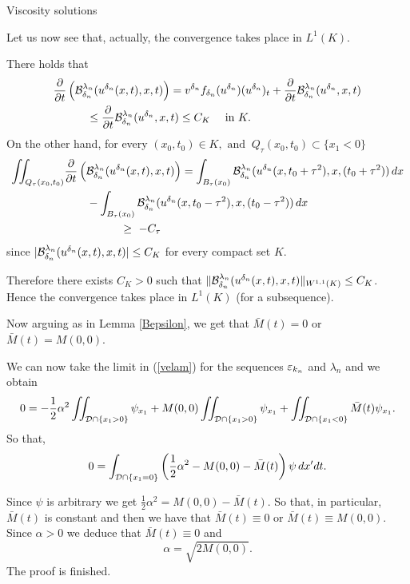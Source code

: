 \begin{section}{Viscosity solutions}
\begin{pf}
Let us now see that, actually,  the convergence takes place in $L^1(K)$.

There holds that 
\begin{align*}
&\frac{\partial}{\partial t}\left({\cal B}^{\lambda_n}_{\delta_n}
(u^{\delta_n}(x,t), x, t)\right) = 
v^{\delta_n}f_{\delta_n}(u^{\delta_n})(u^{\delta_n})_t + 
\frac{\partial}{\partial t}{\cal B}^{\lambda_n}_{\delta_n}
(u^{\delta_n},x, t)\\
&\qquad\quad\le \frac{\partial}{\partial t}{\cal B}^{\lambda_n}_{\delta_n}
(u^{\delta_n}, x, t)
\le C_K\quad\mbox{ in } K.
\end{align*}
On the other hand, for every $(x_0,t_0)\in K,\mbox{ and }\ Q_\tau(x_0,t_0)\subset\{x_1<0\}$
\begin{align*}
\iint_{Q_\tau(x_0,t_0)}&\frac{\partial}{\partial t}\left(
{\cal B}^{\lambda_n}_{\delta_n}(u^{\delta_n}(x,t), x, t)\right) =
\int_{B_\tau(x_0)}{\cal B}^{\lambda_n}_{\delta_n}
(u^{\delta_n}(x,t_0+\tau^2), x,(t_0+\tau^2))\, dx\\
& \qquad- \int_{B_\tau(x_0)}{\cal B}^{\lambda_n}_{\delta_n}
(u^{\delta_n}(x,t_0-\tau^2),x, (t_0-\tau^2))\, dx\\
&\quad\qquad\qquad \ge\ -C_\tau
\end{align*}
since $|{\cal B}^{\lambda_n}_{\delta_n}(u^{\delta_n}(x,t), x, t)|
\le  C_K$ 
for every compact set $K$.

Therefore there exists $C_K>0$ such that $\| {\cal B}^{\lambda_n}_{\delta_n}
(u^{\delta_n}(x,t), x,t)\|_{W^{1,1}(K)}\le C_K$. Hence the convergence takes
place in $L^1(K)$ (for a subsequence).

Now arguing  as in Lemma \ref{Bepsilon}, we get that $\bar M(t)=0$ or 
$\bar M(t)=M(0,0)$.

We can now take the limit in (\ref{velam}) for the sequences $\varepsilon_{k_n}$ and
$\lambda_n$ and  we
obtain
$$0 = -\frac12 \alpha^2\iint_{{\cal D}\cap\{x_1>0\}} \psi_{x_1} + 
M(0,0)\iint_{{\cal D}\cap\{x_1>0\}} \psi_{x_1} + 
\iint_{{\cal D}\cap\{x_1<0\}} \bar M(t) \psi_{x_1}.$$
So that,
$$0 = \int_{{\cal D}\cap\{x_1=0\}}\left(\frac12 \alpha^2 - M(0,0) - \bar M(t)\right)
\psi\, dx' dt.$$

Since $\psi$ is arbitrary we get $\frac12 \alpha^2 = M(0,0) -\bar M(t)$. So that, 
in particular, $\bar M(t)$ is constant and then we have that 
$\bar M(t)\equiv 0$ or $\bar M(t)\equiv M(0,0)$. Since $\alpha>0$ we deduce that $\bar M(t)\equiv 0$ 
and 
$$\alpha = \sqrt{2M(0,0)}.$$
The proof is finished.
\end{pf}






\end{section}
